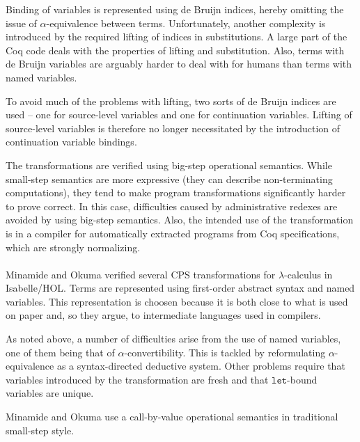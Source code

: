 \documentclass[a4paper,11pt,draft]{article}
\newcommand{\kw}[1]{\mathtt{#1}}
\begin{document}
Binding of variables is represented using de Bruijn indices, hereby omitting
the issue of $\alpha$-equivalence between terms.
Unfortunately, another complexity is introduced by the required lifting of
indices in substitutions.
A large part of the Coq code deals with the properties of lifting and
substitution.
Also, terms with de Bruijn variables are arguably harder to deal with for
humans than terms with named variables.

To avoid much of the problems with lifting, two sorts of de Bruijn indices are
used -- one for source-level variables and one for continuation variables.
Lifting of source-level variables is therefore no longer necessitated by the
introduction of continuation variable bindings.

The transformations are verified using big-step operational semantics.
While small-step semantics are more expressive (they can describe
non-terminating computations), they tend to make program transformations
significantly harder to prove correct.
In this case, difficulties caused by administrative redexes are avoided by
using big-step semantics.
Also, the intended use of the transformation is in a compiler for
automatically extracted programs from Coq specifications, which are strongly
normalizing.

\paragraph{}

Minamide and Okuma \cite{Minamide-Okuma-03} verified several CPS
transformations for $\lambda$-calculus in Isabelle/HOL.
Terms are represented using first-order abstract syntax and named variables.
This representation is choosen because it is both close to what is used on
paper and, so they argue, to intermediate languages used in compilers.

As noted above, a number of difficulties arise from the use of named
variables, one of them being that of $\alpha$-convertibility.
This is tackled by reformulating $\alpha$-equivalence as a syntax-directed
deductive system. Other problems require that variables introduced by the
transformation are fresh and that $\kw{let}$-bound variables are unique.

Minamide and Okuma use a call-by-value operational semantics in traditional
small-step style.

\paragraph{}
\end{document}
